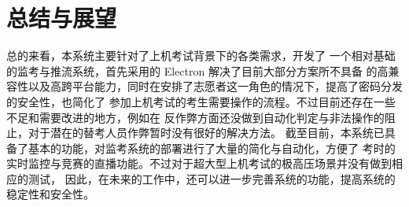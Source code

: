 \newpage    %


\section{总结与展望}

总的来看，本系统主要针对了上机考试背景下的各类需求，开发了
一个相对基础的监考与推流系统，首先采用的 Electron 解决了目前大部分方案所不具备
的高兼容性以及高跨平台能力，同时在安排了志愿者这一角色的情况下，提高了密码分发的安全性，也简化了
参加上机考试的考生需要操作的流程。不过目前还存在一些不足和需要改进的地方，例如在
反作弊方面还没做到自动化判定与非法操作的阻止，对于潜在的替考人员作弊暂时没有很好的解决方法。
截至目前，本系统已具备了基本的功能，对监考系统的部署进行了大量的简化与自动化，方便了
考时的实时监控与竞赛的直播功能。不过对于超大型上机考试的极高压场景并没有做到相应的测试，
因此，在未来的工作中，还可以进一步完善系统的功能，提高系统的稳定性和安全性。

